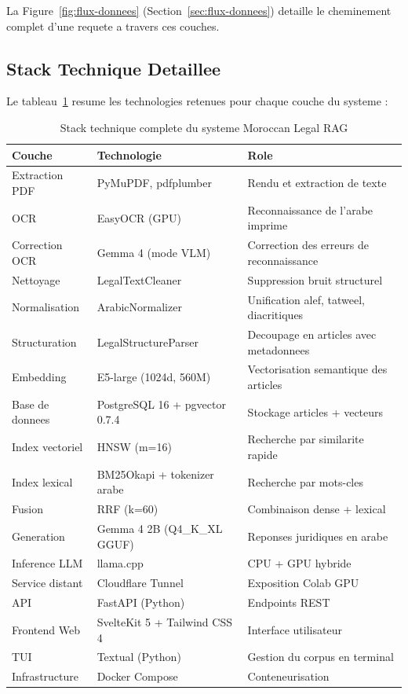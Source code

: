 La Figure~\ref{fig:flux-donnees} (Section~\ref{sec:flux-donnees}) detaille le cheminement complet d'une requete a travers ces couches.

\subsection{Stack Technique Detaillee}

Le tableau~\ref{tab:stack-technique} resume les technologies retenues pour chaque couche du systeme :

\begin{table}[h]
\centering
\renewcommand{\arraystretch}{1.3}
\begin{tabular}{|l|l|l|}
\hline
\rowcolor{LightBlue}
\textbf{\color{PrimaryBlue}Couche} & \textbf{\color{PrimaryBlue}Technologie} & \textbf{\color{PrimaryBlue}Role} \\
\hline
Extraction PDF & PyMuPDF, pdfplumber & Rendu et extraction de texte \\
OCR & EasyOCR (GPU) & Reconnaissance de l'arabe imprime \\
Correction OCR & Gemma 4 (mode VLM) & Correction des erreurs de reconnaissance \\
Nettoyage & LegalTextCleaner & Suppression bruit structurel \\
Normalisation & ArabicNormalizer & Unification alef, tatweel, diacritiques \\
Structuration & LegalStructureParser & Decoupage en articles avec metadonnees \\
\hline
Embedding & E5-large (1024d, 560M) & Vectorisation semantique des articles \\
Base de donnees & PostgreSQL 16 + pgvector 0.7.4 & Stockage articles + vecteurs \\
Index vectoriel & HNSW (m=16) & Recherche par similarite rapide \\
Index lexical & BM25Okapi + tokenizer arabe & Recherche par mots-cles \\
\hline
Fusion & RRF (k=60) & Combinaison dense + lexical \\
Generation & Gemma 4 2B (Q4\_K\_XL GGUF) & Reponses juridiques en arabe \\
Inference LLM & llama.cpp & CPU + GPU hybride \\
Service distant & Cloudflare Tunnel & Exposition Colab GPU \\
\hline
API & FastAPI (Python) & Endpoints REST \\
Frontend Web & SvelteKit 5 + Tailwind CSS 4 & Interface utilisateur \\
TUI & Textual (Python) & Gestion du corpus en terminal \\
Infrastructure & Docker Compose & Conteneurisation \\
\hline
\end{tabular}
\caption{Stack technique complete du systeme Moroccan Legal RAG}
\label{tab:stack-technique}
\end{table}

